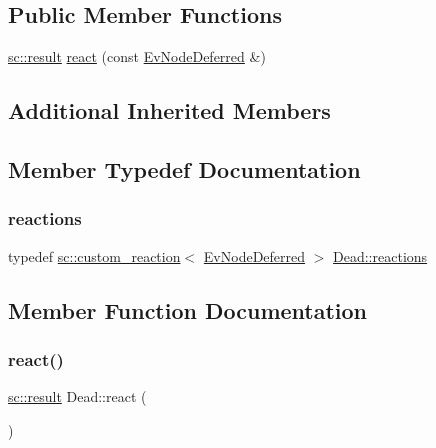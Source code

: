 \subsection*{Public Member Functions}
\begin{DoxyCompactItemize}
\item 
\mbox{\hyperlink{namespaceboost_1_1statechart_abe807f6598b614d6d87bb951ecd92331}{sc\+::result}} \mbox{\hyperlink{struct_dead_a9aa6233af0e887efc1a5b298e4184288}{react}} (const \mbox{\hyperlink{struct_ev_node_deferred}{Ev\+Node\+Deferred}} \&)
\end{DoxyCompactItemize}
\subsection*{Additional Inherited Members}


\subsection{Member Typedef Documentation}
\mbox{\label{struct_dead_aa0af9b4a2573a0ac901441ee8f19668a}} 
\subsubsection{\texorpdfstring{reactions}{reactions}}
{\footnotesize\ttfamily typedef \mbox{\hyperlink{classboost_1_1statechart_1_1custom__reaction}{sc\+::custom\+\_\+reaction}}$<$ \mbox{\hyperlink{struct_ev_node_deferred}{Ev\+Node\+Deferred}} $>$ \mbox{\hyperlink{struct_dead_aa0af9b4a2573a0ac901441ee8f19668a}{Dead\+::reactions}}}



\subsection{Member Function Documentation}
\mbox{\label{struct_dead_a9aa6233af0e887efc1a5b298e4184288}} 
\subsubsection{\texorpdfstring{react()}{react()}}
{\footnotesize\ttfamily \mbox{\hyperlink{namespaceboost_1_1statechart_abe807f6598b614d6d87bb951ecd92331}{sc\+::result}} Dead\+::react (\begin{DoxyParamCaption}\item[{const \mbox{\hyperlink{struct_ev_node_deferred}{Ev\+Node\+Deferred}} \&}]{ }\end{DoxyParamCaption})\hspace{0.3cm}{\ttfamily [inline]}}

